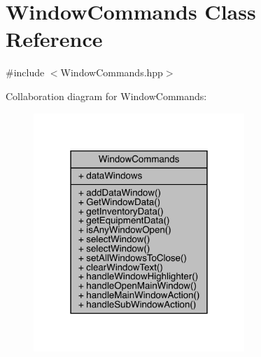 \hypertarget{class_window_commands}{}\section{Window\+Commands Class Reference}
\label{class_window_commands}


{\ttfamily \#include $<$Window\+Commands.\+hpp$>$}



Collaboration diagram for Window\+Commands\+:
\nopagebreak
\begin{figure}[H]
\begin{center}
\leavevmode
\includegraphics[width=226pt]{df/d26/class_window_commands__coll__graph}
\end{center}
\end{figure}

